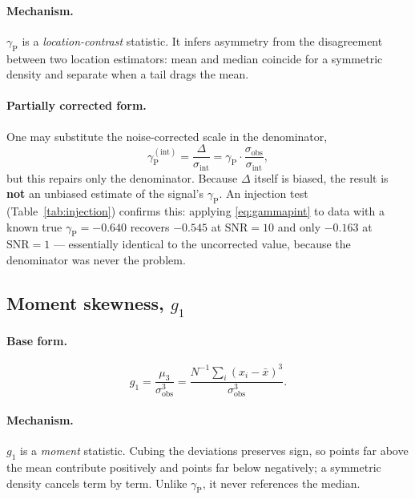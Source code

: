 \documentclass[11pt]{article}
\newcommand{\gp}{\gamma_{\mathrm{P}}}
\newcommand{\sigobs}{\sigma_{\mathrm{obs}}}
\newcommand{\sigint}{\sigma_{\mathrm{int}}}
\begin{document}
\paragraph{Mechanism.} $\gp$ is a \emph{location-contrast} statistic. It infers
asymmetry from the disagreement between two location estimators: mean and median
coincide for a symmetric density and separate when a tail drags the mean.

\paragraph{Partially corrected form.} One may substitute the noise-corrected
scale in the denominator,
%
\begin{equation}
  \gp^{\mathrm{(int)}} = \frac{\Delta}{\sigint}
                       = \gp \cdot \frac{\sigobs}{\sigint},
  \label{eq:gammapint}
\end{equation}
%
but this repairs only the denominator. Because $\Delta$ itself is biased, the
result is \textbf{not} an unbiased estimate of the signal's $\gp$. An injection
test (Table~\ref{tab:injection}) confirms this: applying \eqref{eq:gammapint} to
data with a known true $\gp = -0.640$ recovers $-0.545$ at $\mathrm{SNR}=10$ and
only $-0.163$ at $\mathrm{SNR}=1$ --- essentially identical to the uncorrected
value, because the denominator was never the problem.

\subsection{Moment skewness, $g_1$}
\label{sec:g1}

\paragraph{Base form.}
%
\begin{equation}
  g_1 = \frac{\mu_3}{\sigobs^{3}}
      = \frac{N^{-1}\sum_i \left(x_i-\bar{x}\right)^{3}}{\sigobs^{3}} .
  \label{eq:g1}
\end{equation}

\paragraph{Mechanism.} $g_1$ is a \emph{moment} statistic. Cubing the deviations
preserves sign, so points far above the mean contribute positively and points far
below negatively; a symmetric density cancels term by term. Unlike $\gp$, it
never references the median.
\end{document}
